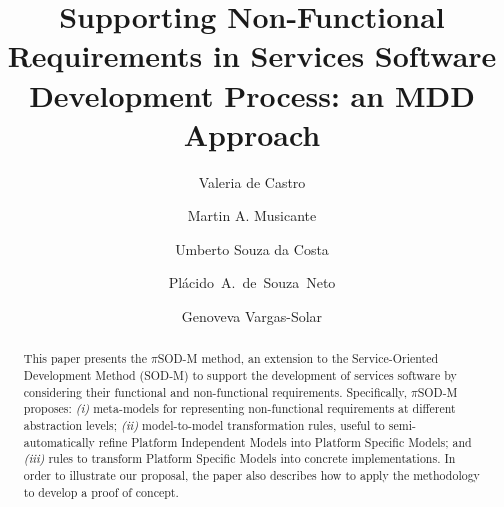 \documentclass{llncs}
\theoremstyle{plain}
\theoremstyle{plain}
\theoremstyle{plain}
\begin{document}
%

 
\title{Supporting Non-Functional Requirements in Services Software Development Process: an MDD Approach}

\author{Valeria de Castro \and Martin A. Musicante \and Umberto Souza da Costa \and Pl\'acido~A.~de~Souza~Neto \and Genoveva Vargas-Solar}



 
\maketitle
\begin{abstract}
This paper presents the $\pi$SOD-M method, an extension to the Service-Oriented Development Method (SOD-M) to support the development of services software by considering their functional and    non-functional requirements. 
Specifically, $\pi$SOD-M proposes: 
\textit{(i)} meta-models for representing non-functional requirements at different abstraction levels; 
\textit{(ii)} model-to-model transformation rules, useful to semi-automatically refine Platform Independent Models into Platform Specific Models; and 
\textit{(iii)} rules to transform Platform Specific Models into concrete implementations. 
In order to illustrate our proposal, the paper also describes how to apply the methodology to develop a proof of concept.
\end{abstract}


\end{document}
